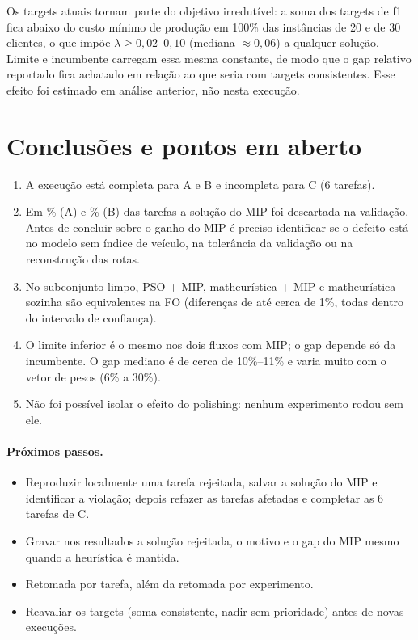 \documentclass[11pt,a4paper]{article}
\begin{document}
Os targets atuais tornam parte do objetivo irredutível: a soma dos targets de f1
fica abaixo do custo mínimo de produção em 100\% das instâncias de 20 e de 30
clientes, o que impõe $\lambda\ge 0{,}02$--$0{,}10$ (mediana $\approx 0{,}06$) a
qualquer solução. Limite e incumbente carregam essa mesma constante, de modo que o
gap relativo reportado fica achatado em relação ao que seria com targets
consistentes. Esse efeito foi estimado em análise anterior, não nesta execução.

\section{Conclusões e pontos em aberto}

\begin{enumerate}[leftmargin=*]
  \item A execução está completa para A e B e incompleta para C (6 tarefas).
  \item Em \pctAfallback\% (A) e \pctBfallback\% (B) das tarefas a solução do MIP foi descartada
  na validação. Antes de concluir sobre o ganho do MIP é preciso identificar se o
  defeito está no modelo sem índice de veículo, na tolerância da validação ou na
  reconstrução das rotas.
  \item No subconjunto limpo, PSO + MIP, matheurística + MIP e matheurística sozinha
  são equivalentes na FO (diferenças de até cerca de 1\%, todas dentro do intervalo
  de confiança).
  \item O limite inferior é o mesmo nos dois fluxos com MIP; o gap depende só da
  incumbente. O gap mediano é de cerca de 10\%--11\% e varia muito com o vetor de
  pesos (6\% a 30\%).
  \item Não foi possível isolar o efeito do polishing: nenhum experimento rodou sem ele.
\end{enumerate}

\paragraph{Próximos passos.}
\begin{itemize}[leftmargin=*]
  \item Reproduzir localmente uma tarefa rejeitada, salvar a solução do MIP e identificar a
  violação; depois refazer as tarefas afetadas e completar as 6 tarefas de C.
  \item Gravar nos resultados a solução rejeitada, o motivo e o gap do MIP mesmo quando a
  heurística é mantida.
  \item Retomada por tarefa, além da retomada por experimento.
  \item Reavaliar os targets (soma consistente, nadir sem prioridade) antes de novas execuções.
\end{itemize}
\end{document}
